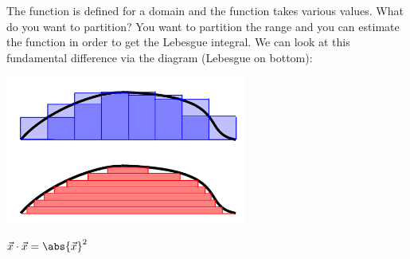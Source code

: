 \documentclass{scrreprt}
\begin{document}
\begin{remark}
The function is defined for a domain and the function takes various values. What do you want to
partition? You want to partition the range and you can estimate the function in order to get the
Lebesgue integral. We can look at this fundamental difference via the diagram (Lebesgue on bottom):

\includegraphics[width=300px]{figures/2022-08-25-11-47-29.png}
\end{remark}

\begin{fact}
	$\vec{x}\cdot \vec{x} = \abs{\vec{x}}^2$
\end{fact}
\end{document}
